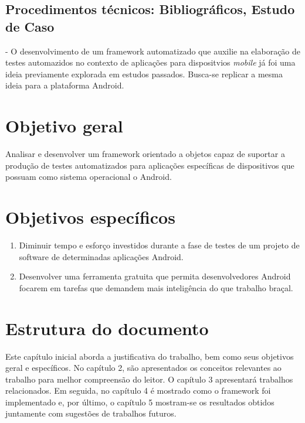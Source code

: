 \documentclass[
    12pt,       %
    openright,      %
    twoside,      %
    a4paper,      %
    english,      %
    french,       %
    spanish,      %
    brazil,       %
    ]{abntex2}
\begin{document}
    \subsection{Procedimentos técnicos: Bibliográficos, Estudo de Caso} - O desenvolvimento
    de um framework automatizado que auxilie na elaboração de testes automazidos no
    contexto de aplicações para dispositvios \textit{mobile} já foi uma ideia previamente
    explorada em estudos passados. Busca-se replicar a mesma ideia para a plataforma
    Android.

  \section{Objetivo geral}
      Analisar e desenvolver um framework orientado a objetos capaz de suportar a produção
      de testes automatizados para aplicações específicas de dispositivos que possuam como
      sistema operacional o Android.

  \section{Objetivos específicos}
  \begin{enumerate}
      \item Diminuir tempo e esforço investidos durante a fase de testes de um projeto de software
            de determinadas aplicações Android.
      \item Desenvolver uma ferramenta gratuita que permita desenvolvedores Android focarem
            em tarefas que demandem mais inteligência do que trabalho braçal.
  \end{enumerate}

  \section{Estrutura do documento}
      Este capítulo inicial aborda a justificativa do trabalho, bem como seus
      objetivos geral e específicos. No capítulo 2, são apresentados os
      conceitos relevantes ao trabalho para melhor compreensão do leitor.
      O capítulo 3 apresentará trabalhos relacionados. Em seguida,
      no capítulo 4 é mostrado como o framework foi implementado e, por
      último, o capítulo 5 mostram-se os resultados obtidos juntamente com
      sugestões de trabalhos futuros.
\end{document}

